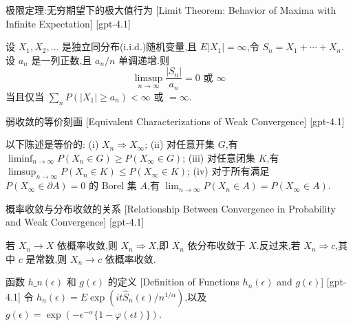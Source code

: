 \documentclass[UTF8]{ctexart}
\begin{document}
    
    
    \begin{thm}
        {极限定理:无穷期望下的极大值行为}
        [Limit Theorem: Behavior of Maxima with Infinite Expectation]
        [gpt-4.1]
        
设 $X_{1}, X_{2}, \ldots$ 是独立同分布(i.i.d.)随机变量,且 $E|X_{1}| = \infty$,令 $S_{n} = X_{1} + \cdots + X_{n}$.设 $a_{n}$ 是一列正数,且 $a_{n}/n$ 单调递增.则
\[
\operatorname*{limsup}_{n \to \infty} \frac{|S_{n}|}{a_{n}} = 0 \text{ 或 } \infty
\]
当且仅当 $\sum_{n} P(|X_{1}| \geq a_{n}) < \infty$ 或 $= \infty$.

    \end{thm}
    
    
    
    \begin{thm}
        {弱收敛的等价刻画}
        [Equivalent Characterizations of Weak Convergence]
        [gpt-4.1]
        
以下陈述是等价的:
(i) $X_{n} \Rightarrow X_{\infty}$;
(ii) 对任意开集 $G$,有 $\liminf_{n \to \infty} P(X_{n} \in G) \geq P(X_{\infty} \in G)$;
(iii) 对任意闭集 $K$,有 $\limsup_{n \to \infty} P(X_{n} \in K) \leq P(X_{\infty} \in K)$;
(iv) 对于所有满足 $P(X_{\infty} \in \partial A) = 0$ 的 Borel 集 $A$,有 $\lim_{n \to \infty} P(X_{n} \in A) = P(X_{\infty} \in A)$.

    \end{thm}
    
    
    
    \begin{thm}
        {概率收敛与分布收敛的关系}
        [Relationship Between Convergence in Probability and Weak Convergence]
        [gpt-4.1]
        
若 $X_n \to X$ 依概率收敛,则 $X_n \Rightarrow X$,即 $X_n$ 依分布收敛于 $X$.反过来,若 $X_n \Rightarrow c$,其中 $c$ 是常数,则 $X_n \to c$ 依概率收敛.

    \end{thm}
    
    
    
    \begin{dfn}
        {函数 $h\_n(\epsilon)$ 和 $g(\epsilon)$ 的定义}
        [Definition of Functions $h_n(\epsilon)$ and $g(\epsilon)$]
        [gpt-4.1]
        令 $h_{n}(\epsilon) = E \exp(i t \hat{S}_{n}(\epsilon) / n^{1/\alpha})$,以及 $g(\epsilon) = \exp(-\epsilon^{-\alpha}\{1 - \varphi(\epsilon t)\})$.
    \end{dfn}
    
\end{document}
